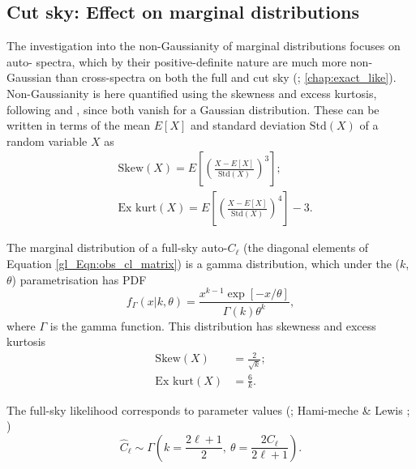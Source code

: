 \subsection{Cut sky: Effect on marginal distributions}
\label{gl_Sec:ma_marginals}

The investigation into the non-Gaussianity of marginal distributions focuses on auto- \linebreak spectra, which by their positive-definite nature are much more non-Gaussian than cross-spectra on both the full and cut sky (\cite{Percival2006}; \autoref{chap:exact_like}).
Non-Gaussianity is here quantified using the skewness and excess kurtosis, following \citet{Lin2020} and \citet{DiazRivero2020}, since both vanish for a Gaussian distribution. These can be written in terms of the mean $E \left[ X \right]$ and standard deviation $\text{Std} \left( X \right)$ of a random variable $X$ as
\begin{align}
&\text{Skew} \left( X \right) =
E \left[ \left( \frac{X - E \left[ X \right]}
{ \text{Std} \left( X \right) } \right)^3 \right]; \\
&\text{Ex kurt} \left( X \right) =
E \left[ \left( \frac{X - E \left[ X \right]}
{ \text{Std} \left( X \right) } \right)^4 \right] - 3.
\end{align}

The marginal distribution of a full-sky auto-$C_\ell$ (the diagonal elements of Equation \ref{gl_Eqn:obs_cl_matrix}) is a gamma distribution, which under the ($k$, $\theta$) parametrisation has PDF
\begin{equation}
f_\Gamma \left( x | k, \theta \right) =
\frac{x^{k - 1} \exp \left[ - x / \theta \right]}
{\Gamma (k) \theta^k},
\end{equation}
where $\Gamma$ is the gamma function. This distribution has skewness and excess kurtosis
\begin{align}
\text{Skew} \left( X \right) &= \frac{2}{\sqrt{k}}; \\
\text{Ex kurt} \left( X \right) &= \frac{6}{k}.
\end{align}

The full-sky likelihood corresponds to parameter values
(\cite{Percival2006}; Hami-meche \& Lewis \citeyear{Hamimeche2008}; \cite{Sellentin2018a})
\begin{equation}
\widehat{C}_\ell \sim \Gamma \left(
k = \frac{2 \ell + 1}{2},~
\theta = \frac{2 C_\ell}{2 \ell + 1} \right).
\end{equation}

